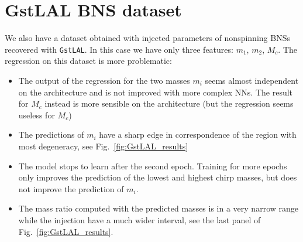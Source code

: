 \documentclass[prd,aps,twocolumn,a4paper,showkeys,nofootinbib]{revtex4-1}
\begin{document}
\section{GstLAL BNS dataset}
\label{sec:GstLAL}
We also have a dataset obtained with injected parameters of nonspinning 
BNSs recovered with \texttt{GstLAL}.
In this case we have only three features: $m_1$, $m_2$, $M_c$.
The regression on this dataset is more problematic:
\begin{itemize}
\item The output of the regression for the two masses $m_i$ seems almost independent on the 
architecture and is not improved with more complex NNs. The result for $M_c$ instead is 
more sensible on the architecture (but the regression seems useless for $M_c$)

\item The predictions of $m_i$ have a sharp edge in correspondence of the region with 
most degeneracy, see Fig.~\ref{fig:GstLAL_results}

\item The model stops to learn after the second epoch. Training for more epochs only improves
the prediction of the lowest and highest chirp masses, but does not improve the prediction
of $m_i$. 

\item The mass ratio computed with the predicted masses is in a very narrow range while
the injection have a much wider interval, see the last panel of Fig.~\ref{fig:GstLAL_results}.

\end{itemize} 
\end{document}
